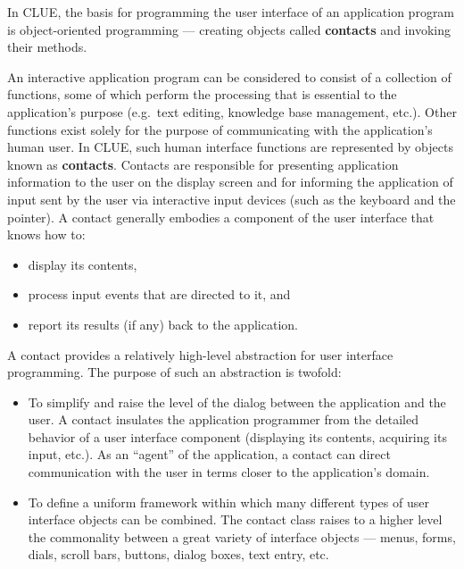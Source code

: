 %
%
%
In CLUE, the basis for programming the user interface of an application
program is object-oriented programming --- creating objects called
{\bf contacts} and invoking their methods.  

An interactive application program can be considered to consist of a collection
of functions,  some of which perform the processing that is essential
to the application's purpose (e.g.\ text editing, knowledge base management,
etc.).  Other functions exist solely for the purpose of communicating with
the application's human user.  In CLUE, such human interface functions are
represented by objects known as {\bf contacts}.  Contacts are responsible for
presenting application information to the user on the display screen and for
informing the application of input sent by the user via interactive input
devices (such as the keyboard and the pointer).  A contact generally embodies a
component of the user interface that knows how to:
\begin{itemize}
\item  display its contents,
\item process input events that are directed to it, and 
\item report its results (if any) back to the application.
\end{itemize}

A contact provides a relatively high-level abstraction for user interface
programming.  The purpose of such an abstraction is twofold: 
\begin{itemize}	
\item To simplify and raise the level of the dialog between the application and
the user. A contact insulates the application programmer from the detailed behavior
of a user interface component (displaying its contents, acquiring its input,
etc.). As an ``agent'' of the application, a contact can direct 
communication with the user in terms closer to the application's domain.

\item To define a uniform framework within which many different types of user
interface objects can be combined. The contact class raises to a higher level the
commonality between a great variety of interface objects --- menus, forms,
dials, scroll bars, buttons, dialog boxes, text entry, etc.
\end{itemize}

